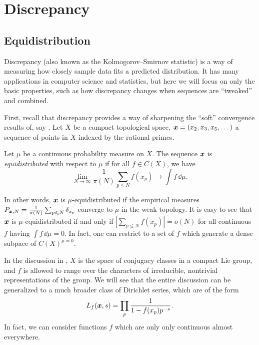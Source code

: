 
\chapter{Discrepancy}





\section{Equidistribution}

Discrepancy (also known as the Kolmogorov--Smirnov statistic) is a way of 
measuring how closely sample data fits a predicted distribution. It has many 
applications in computer science and statistics, but here we will focus on only 
the basic properties, such as how discrepancy changes when sequences 
are ``tweaked'' and combined. 

First, recall that discrepancy provides a way of sharpening the ``soft'' 
convergence results of, say \cite[A.1]{serre-1989}. Let $X$ be a compact 
topological space, ${\boldsymbol x} = (x_2,x_3,x_5,\dots)$ a sequence of points in $X$ 
indexed by the rational primes. 

\begin{definition}
Let $\mu$ be a continuous probability measure on $X$. The sequence ${\boldsymbol x}$ is 
\emph{equidistributed} with respect to $\mu$ if for all $f\in C(X)$, we have 
\[
	\lim_{N\to \infty} \frac{1}{\pi(N)} \sum_{p\leqslant N} f(x_p) \to \int f\, \dd \mu .
\]
\end{definition}

In other words, ${\boldsymbol x}$ is $\mu$-equidistributed if the empirical measures 
$P_{{\boldsymbol x},N} = \frac{1}{\pi(N)} \sum_{p\leqslant N} \delta_{x_p}$ converge to 
$\mu$ in the weak topology. It is easy to see that ${\boldsymbol x}$ is 
$\mu$-equidistributed if and only if 
$\left| \sum_{p\leqslant N} f(x_p)\right| = o(N)$ for all continuous $f$ having 
$\int f\, \dd\mu = 0$. In fact, one can restrict to a set of $f$ which generate 
a dense subpace of $C(X)^{\mu = 0}$. 

In the discussion in \cite[A.1]{serre-1989}, $X$ is the space of conjugacy 
classes in a compact Lie group, and $f$ is allowed to range over the characters 
of irreducible, nontrivial representations of the group. We will see that the 
entire discussion can be generalized to a much broader class of 
Dirichlet series, which are of the form 
\[
	L_f({\boldsymbol x},s) = \prod_p \frac{1}{1-f(x_p)p^{-s}} .
\]
In fact, we can consider functions $f$ which are only only continuous almost 
everywhere. 

